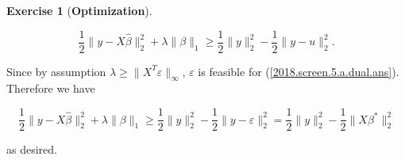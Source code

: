 \documentclass{article}
\theoremstyle{definition}
\newtheorem{exercise}{Exercise}
\theoremstyle{definition}
\theoremstyle{definition}
\theoremstyle{definition}
\theoremstyle{definition}
\renewcommand{\epsilon}{\varepsilon}
\renewcommand{\epsilon}{\varepsilon}
\begin{document}
\begin{exercise}[\textbf{Optimization}]
\begin{enumerate}[(a)]
\begin{enumerate}[(i)]
\[
\frac{1}{2} \lVert y - X \hat{\beta} \rVert_2^2 + \lambda \lVert \beta \rVert_1 \geq  \frac{1}{2} \lVert y \rVert_2^2 - \frac{1}{2} \lVert y - u \rVert_2^2.
\]

Since by assumption \(\lambda \geq \lVert X^T \epsilon \rVert_\infty\), \(\epsilon\) is feasible for (\ref{2018.screen.5.a.dual.ans}). Therefore we have

\begin{equation}\label{2018.screen.5.c.ii.result}
\frac{1}{2} \lVert y - X \hat{\beta} \rVert_2^2 + \lambda \lVert \beta \rVert_1 \geq  \frac{1}{2} \lVert y \rVert_2^2 - \frac{1}{2} \lVert y - \epsilon \rVert_2^2 =  \frac{1}{2} \lVert y \rVert_2^2 - \frac{1}{2} \lVert X \beta^* \rVert_2^2
\end{equation}

as desired.


\end{enumerate}
\end{enumerate}
\end{exercise}
\end{document}
